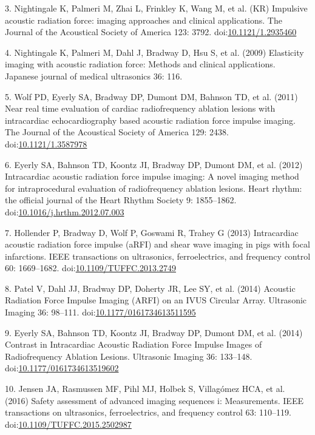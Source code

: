 \documentclass[]{article}
\begin{document}
3. Nightingale K, Palmeri M, Zhai L, Frinkley K, Wang M, et al. (KR)
Impulsive acoustic radiation force: imaging approaches and clinical
applications. The Journal of the Acoustical Society of America 123:
3792. doi:\href{http://dx.doi.org/10.1121/1.2935460}{10.1121/1.2935460}

4. Nightingale K, Palmeri M, Dahl J, Bradway D, Hsu S, et al. (2009)
Elasticity imaging with acoustic radiation force: Methods and clinical
applications. Japanese journal of medical ultrasonics 36: 116.

5. Wolf PD, Eyerly SA, Bradway DP, Dumont DM, Bahnson TD, et al. (2011)
Near real time evaluation of cardiac radiofrequency ablation lesions
with intracardiac echocardiography based acoustic radiation force
impulse imaging. The Journal of the Acoustical Society of America 129:
2438. doi:\href{http://dx.doi.org/10.1121/1.3587978}{10.1121/1.3587978}

6. Eyerly SA, Bahnson TD, Koontz JI, Bradway DP, Dumont DM, et al.
(2012) Intracardiac acoustic radiation force impulse imaging: A novel
imaging method for intraprocedural evaluation of radiofrequency ablation
lesions. Heart rhythm: the official journal of the Heart Rhythm Society
9: 1855--1862.
doi:\href{http://dx.doi.org/10.1016/j.hrthm.2012.07.003}{10.1016/j.hrthm.2012.07.003}

7. Hollender P, Bradway D, Wolf P, Goswami R, Trahey G (2013)
Intracardiac acoustic radiation force impulse (aRFI) and shear wave
imaging in pigs with focal infarctions. IEEE transactions on
ultrasonics, ferroelectrics, and frequency control 60: 1669--1682.
doi:\href{http://dx.doi.org/10.1109/TUFFC.2013.2749}{10.1109/TUFFC.2013.2749}

8. Patel V, Dahl JJ, Bradway DP, Doherty JR, Lee SY, et al. (2014)
Acoustic Radiation Force Impulse Imaging (ARFI) on an IVUS Circular
Array. Ultrasonic Imaging 36: 98--111.
doi:\href{http://dx.doi.org/10.1177/0161734613511595}{10.1177/0161734613511595}

9. Eyerly SA, Bahnson TD, Koontz JI, Bradway DP, Dumont DM, et al.
(2014) Contrast in Intracardiac Acoustic Radiation Force Impulse Images
of Radiofrequency Ablation Lesions. Ultrasonic Imaging 36: 133--148.
doi:\href{http://dx.doi.org/10.1177/0161734613519602}{10.1177/0161734613519602}

10. Jensen JA, Rasmussen MF, Pihl MJ, Holbek S, Villag{ó}mez HCA, et al.
(2016) Safety assessment of advanced imaging sequences i: Measurements.
IEEE transactions on ultrasonics, ferroelectrics, and frequency control
63: 110--119.
doi:\href{http://dx.doi.org/10.1109/TUFFC.2015.2502987}{10.1109/TUFFC.2015.2502987}
\end{document}
